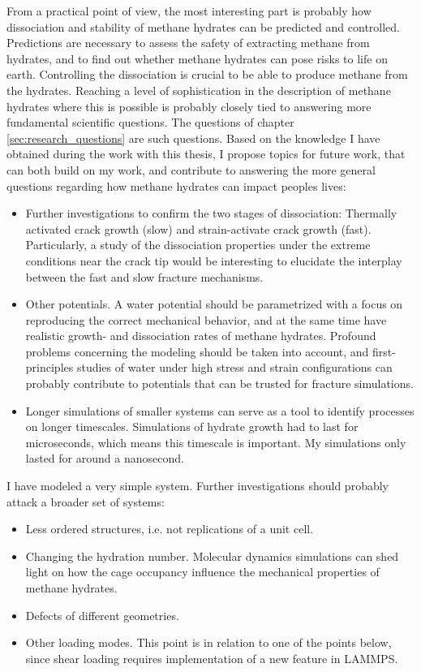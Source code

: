 From a practical point of view, the most interesting part is probably how dissociation and stability of methane hydrates can be predicted and controlled. Predictions are necessary to assess the safety of extracting methane from hydrates, and to find out whether methane hydrates can pose risks to life on earth. Controlling the dissociation is crucial to be able to produce methane from the hydrates. Reaching a level of sophistication in the description of methane hydrates where this is possible is probably closely tied to answering more fundamental scientific questions. The questions of chapter \ref{sec:research_questions} are such questions. Based on the knowledge I have obtained during the work with this thesis, I propose topics for future work, that can both build on my work, and contribute to answering the more general questions regarding how methane hydrates can impact peoples lives:


\begin{itemize}
\item Further investigations to confirm the two stages of dissociation: Thermally activated crack growth (slow) and strain-activate crack growth (fast). Particularly, a study of the dissociation properties under the extreme conditions near the crack tip would be interesting to elucidate the interplay between the fast and slow fracture mechanisms.
\item Other potentials. A water potential should be parametrized with a focus on reproducing the correct mechanical behavior, and at the same time have realistic growth- and dissociation rates of methane hydrates. Profound problems concerning the modeling should be taken into account, and first-principles studies of water under high stress and strain configurations can probably contribute to potentials that can be trusted for fracture simulations. 
\item Longer simulations of smaller systems can serve as a tool to identify processes on longer timescales. Simulations of hydrate growth had to last for microseconds, which means this timescale is important. My simulations only lasted for around a nanosecond.
\end{itemize}

I have modeled a very simple system. Further investigations should probably attack a broader set of systems:

\begin{itemize}
\item Less ordered structures, i.e. not replications of a unit cell.
\item Changing the hydration number. Molecular dynamics simulations can shed light on how the cage occupancy influence the mechanical properties of methane hydrates.
\item Defects of different geometries.
\item Other loading modes. This point is in relation to one of the points below, since shear loading requires implementation of a new feature in LAMMPS.
\end{itemize}
%

